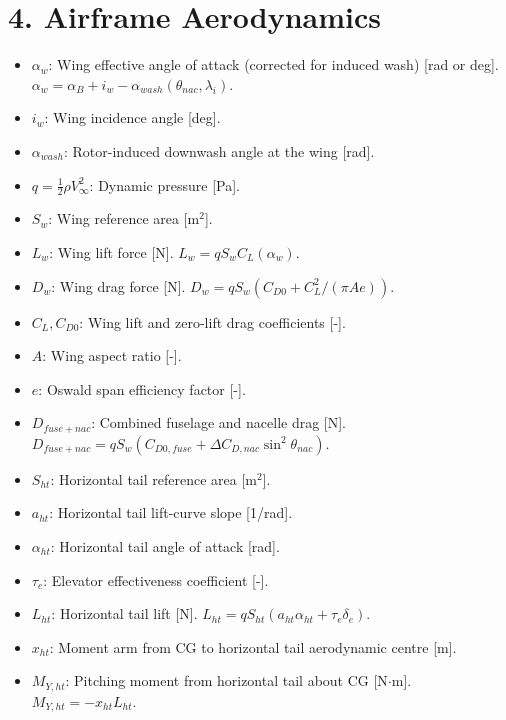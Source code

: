 \documentclass{article}
\begin{document}
\section*{4. Airframe Aerodynamics}
\begin{itemize}
    \item $\alpha_w$: Wing effective angle of attack (corrected for induced wash) [rad or deg]. $\alpha_w = \alpha_B + i_w - \alpha_{wash}(\theta_{nac}, \lambda_i)$.
    \item $i_w$: Wing incidence angle [deg].
    \item $\alpha_{wash}$: Rotor-induced downwash angle at the wing [rad].
    \item $q = \tfrac{1}{2}\rho V_\infty^2$: Dynamic pressure [Pa].
    \item $S_w$: Wing reference area [m$^2$].
    \item $L_w$: Wing lift force [N]. $L_w = qS_w C_L(\alpha_w)$.
    \item $D_w$: Wing drag force [N]. $D_w = qS_w\left(C_{D0} + C_L^2/(\pi A e)\right)$.
    \item $C_L, C_{D0}$: Wing lift and zero-lift drag coefficients [-].
    \item $A$: Wing aspect ratio [-].
    \item $e$: Oswald span efficiency factor [-].
    \item $D_{fuse+nac}$: Combined fuselage and nacelle drag [N]. $D_{fuse+nac} = qS_w\left(C_{D0,fuse} + \Delta C_{D,nac}\sin^2\theta_{nac}\right)$.
    \item $S_{ht}$: Horizontal tail reference area [m$^2$].
    \item $a_{ht}$: Horizontal tail lift-curve slope [1/rad].
    \item $\alpha_{ht}$: Horizontal tail angle of attack [rad].
    \item $\tau_e$: Elevator effectiveness coefficient [-].
    \item $L_{ht}$: Horizontal tail lift [N]. $L_{ht} = qS_{ht}(a_{ht}\alpha_{ht} + \tau_e\delta_e)$.
    \item $x_{ht}$: Moment arm from CG to horizontal tail aerodynamic centre [m].
    \item $M_{Y,ht}$: Pitching moment from horizontal tail about CG [N$\cdot$m]. $M_{Y,ht} = -x_{ht}L_{ht}$.
\end{itemize}
\end{document}
